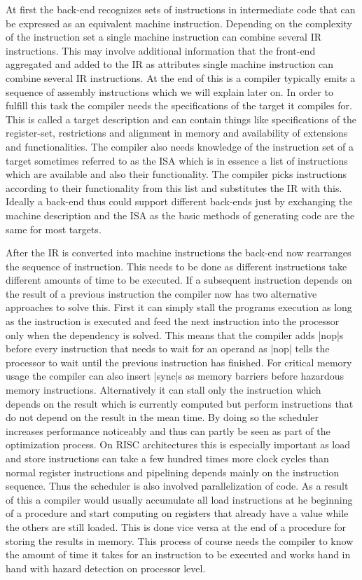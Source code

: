 At first the back-end recognizes sets of instructions in intermediate code that can be expressed as an equivalent machine instruction.
Depending on the complexity of the instruction set a single machine instruction can combine several IR instructions.
This may involve additional information that the front-end aggregated and added to the IR as attributes single machine instruction can combine several IR instructions.
At the end of this is a compiler typically emits a sequence of assembly instructions which we will explain later on.
In order to fulfill this task the compiler needs the specifications of the target it compiles for.
This is called a target description and can contain things like specifications of the register-set, restrictions and alignment in memory and availability of extensions and functionalities.
The compiler also needs knowledge of the instruction set of a target sometimes referred to as the ISA which is in essence a list of instructions which are available and also their functionality.
The compiler picks instructions according to their functionality from this list and substitutes the IR with this.
Ideally a back-end thus could support different back-ends just by exchanging the machine description and the ISA as the basic methods of generating code are the same for most targets.

After the IR is converted into machine instructions the back-end now rearranges the sequence of instruction.
This needs to be done as different instructions take different amounts of time to be executed.
If a subsequent instruction depends on the result of a previous instruction the compiler now has two alternative approaches to solve this.
First it can simply stall the programs execution as long as the instruction is executed and feed the next instruction into the processor only when the dependency is solved.
This means that the compiler adds |nop|s before every instruction that needs to wait for an operand as |nop| tells the processor to wait until the previous instruction has finished.
For critical memory usage the compiler can also insert |sync|s as memory barriers before hazardous memory instructions.
Alternatively it can stall only the instruction which depends on the result which is currently computed but perform instructions that do not depend on the result in the mean time.
By doing so the scheduler increases performance noticeably and thus can partly be seen as part of the optimization process.
On RISC architectures this is especially important as load and store instructions can take a few hundred times more clock cycles than normal register instructions and pipelining depends mainly on the instruction sequence.
Thus the scheduler is also involved parallelization of code.
As a result of this a compiler would usually accumulate all load instructions at he beginning of a procedure and start computing on registers that already have a value while the others are still loaded.
This is done vice versa at the end of a procedure for storing the results in memory.
This process of course needs the compiler to know the amount of time it takes for an instruction to be executed and works hand in hand with hazard detection on processor level.

